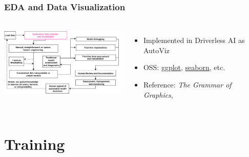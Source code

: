 \documentclass[11pt,
               aspectratio=169,
               hyperref={colorlinks}
               ]{beamer}
\begin{document}
		\begin{frame}
		
			\frametitle{EDA and Data Visualization}		
			
			\begin{columns}
	
				\centering
				\includegraphics[height=100pt]{img/eda.png}
				
				\vspace{-5pt}
				\begin{itemize}
					\item Implemented in Driverless AI as AutoViz
					\item OSS: \href{https://ggplot2.tidyverse.org/}{ggplot}, \href{https://seaborn.pydata.org/}{seaborn}, etc.
					\item Reference: \textit{The Grammar of Graphics}, \cite{wilkinson2006grammar}
				\end{itemize}
				
			\end{columns}
		
		\end{frame}

	\section{Training}
	
\end{document}
